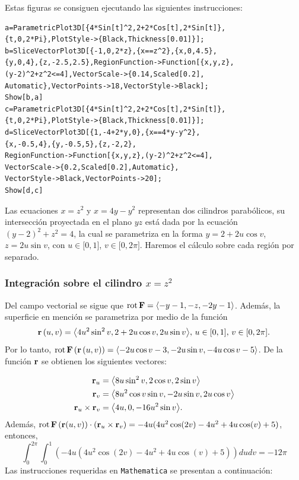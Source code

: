 Estas figuras se consiguen ejecutando las siguientes instrucciones:

\begin{tcolorbox}[title=\bf Instrucción \verb"Mathematica"]\begin{Verbatim}[formatcom=\letraverbatim]
a=ParametricPlot3D[{4*Sin[t]^2,2+2*Cos[t],2*Sin[t]},
{t,0,2*Pi},PlotStyle->{Black,Thickness[0.01]}];
b=SliceVectorPlot3D[{-1,0,2*z},{x==z^2},{x,0,4.5},
{y,0,4},{z,-2.5,2.5},RegionFunction->Function[{x,y,z},
(y-2)^2+z^2<=4],VectorScale->{0.14,Scaled[0.2],
Automatic},VectorPoints->18,VectorStyle->Black];
Show[b,a]
c=ParametricPlot3D[{4*Sin[t]^2,2+2*Cos[t],2*Sin[t]},
{t,0,2*Pi},PlotStyle->{Black,Thickness[0.01]}];
d=SliceVectorPlot3D[{1,-4+2*y,0},{x==4*y-y^2},
{x,-0.5,4},{y,-0.5,5},{z,-2,2},
RegionFunction->Function[{x,y,z},(y-2)^2+z^2<=4],
VectorScale->{0.2,Scaled[0.2],Automatic},
VectorStyle->Black,VectorPoints->20];
Show[d,c]
\end{Verbatim}
\end{tcolorbox}

Las ecuaciones $x=z^{2}$ y $x=4y-y^{2}$ representan dos cilindros parabólicos, su intersección proyectada en el plano $yz$ está dada por la ecuación $\left( y-2\right) ^{2}+z^{2}=4$, la cual se parametriza en la forma $y=2+2u\cos v$, $z=2u\sin v$, con $u\in \lbrack 0,1]$, $v\in \lbrack 0,2\pi ]$. Haremos el cálculo sobre cada región por separado.

\subsubsection{Integración sobre el cilindro \texorpdfstring{$x=z^{2}$}{x=z^2}}

Del campo vectorial se  sigue que ${\rm rot}\,{\bf F}= \left\langle -y-1,-z,-2y-1\right\rangle $.
Además, la superficie en mención se parametriza por medio de la función
\[{\bf r}\left( u,v\right) =\left\langle 4u^{2}\sin ^{2}v,2+2u\cos v,2u\sin v\right\rangle\!,\, u\in \lbrack 0,1],\,v\in \lbrack 0,2\pi ].\] Por lo tanto,
${\rm rot}\,{\bf F}\left({\bf r}\left(u,v\right)\right) = \left\langle -2u\cos v-3,-2u\sin v,-4u\cos v-5\right\rangle $.
De la función ${\bf r}$ se obtienen los siguientes vectores:

\begin{align*}
{\bf r}_{u} &= \left\langle 8u\sin ^{2}v,2\cos v,2\sin v\right\rangle \\
{\bf r}_{v} &=\left\langle 8u^{2}\cos v\sin v,-2u\sin v,2u\cos v\right\rangle \\
{\bf r}_{u}\times {\bf r}_{v} &=\left\langle 4u,0,-16u^{2}\sin v\right\rangle\!.
\end{align*}
Además, ${\rm rot}\,{\bf F}\left({\bf r}(u,v)\right)\cdot\left({\bf r}_{u}\times{\bf r}_{v}\right)=-4 u(4u^2\cos(2v)-4u^2+4 u \cos (v)+5)$, entonces,
\begin{equation}\label{stokes6}
\int_{0}^{2\pi }\int_{0}^{1}\left( -4 u(4u^2\cos(2v)-4u^2+4 u \cos (v)+5)\right) dudv= -12\pi
\end{equation}
Las instrucciones requeridas en \verb"Mathematica" se presentan a continuación:

